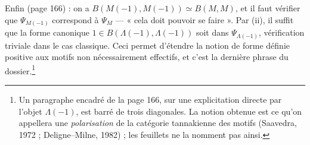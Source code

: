 \documentclass[11pt,a4paper]{article}
\begin{document}
Enfin (page 166) : on a $B(M(-1), M(-1)) \simeq B(M, M)$, et il faut vérifier que
$\Psi_{M(-1)}$ correspond à $\Psi_{M}$ --- « cela doit pouvoir se faire ». Par (ii), il
suffit que la forme canonique $1 \in B(\Lambda(-1), \Lambda(-1))$ soit dans
$\Psi_{\Lambda(-1)}$, vérification triviale dans le cas classique. Ceci permet
d'étendre la notion de forme définie positive aux motifs non nécessairement
effectifs, et c'est la dernière phrase du dossier.\footnote{Un paragraphe encadré de
la page 166, sur une explicitation directe par l'objet $\Lambda(-1)$, est barré de
trois diagonales. La notion obtenue est ce qu'on appellera une \emph{polarisation}
de la catégorie tannakienne des motifs (Saavedra, 1972 ; Deligne--Milne, 1982) ;
les feuillets ne la nomment pas ainsi.}
\end{document}
